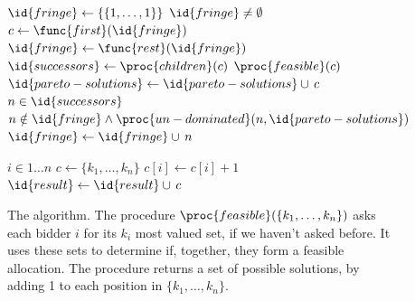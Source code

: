 \begin{figure}
  \begin{minipage}{1.0\linewidth}
    \begin{codebox}
      \li $\id{fringe} \gets \{\{1,\ldots,1\}\}$
      \li \While $\id{fringe} \neq \emptyset$
      \li \Do
      $c \gets \func{first}(\id{fringe})$
      \li    $\id{fringe} \gets \func{rest}(\id{fringe})$
      \li    $\id{successors} \gets \proc{children}(c)$
      \li    \If $\proc{feasible}(c)$
      \li    \Then  $\id{pareto-solutions} \gets \id{pareto-solutions} \cup\, c$
      \li    \Else
      \For $n \in \id{successors}$
      \li           \Do
      \If $n \notin \id{fringe} \wedge
      \proc{un-dominated}(n,\id{pareto-solutions})$
      \li                 \Then $\id{fringe} \gets \id{fringe} \cup\, n$
      \End
      \End
      \End
      \End
    \end{codebox}
    \begin{codebox}
      \li \For $i \in 1\ldots n$ 
      \li \Do $c \gets \{k_1,\ldots,k_n\}$
      \li     $c[i] \gets c[i] + 1$
      \li     $\id{result} \gets \id{result} \cup\, c$
          \End
      \li \Return {}
    \end{codebox}
  \end{minipage}
  \caption{The  algorithm. The procedure
    $\proc{feasible}(\{k_1,\ldots,k_n\})$ asks each bidder $i$ for its
    $k_i$ most valued set, if we haven't asked before. It uses these
    sets to determine if, together, they form a feasible allocation.
    The  procedure returns a set of possible solutions,
    by adding 1 to each position in $\{k_1,\ldots,k_n\}$.}
  \label{fig:par-algorithm}
\end{figure}



